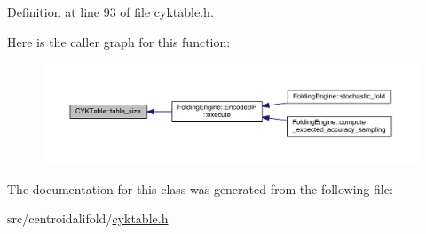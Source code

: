 Definition at line 93 of file cyktable.\+h.



Here is the caller graph for this function\+:
\nopagebreak
\begin{figure}[H]
\begin{center}
\leavevmode
\includegraphics[width=350pt]{class_c_y_k_table_afcd890262b7d4ee4423f62c7c8434f39_icgraph}
\end{center}
\end{figure}




The documentation for this class was generated from the following file\+:\begin{DoxyCompactItemize}
\item 
src/centroidalifold/\hyperlink{cyktable_8h}{cyktable.\+h}\end{DoxyCompactItemize}
